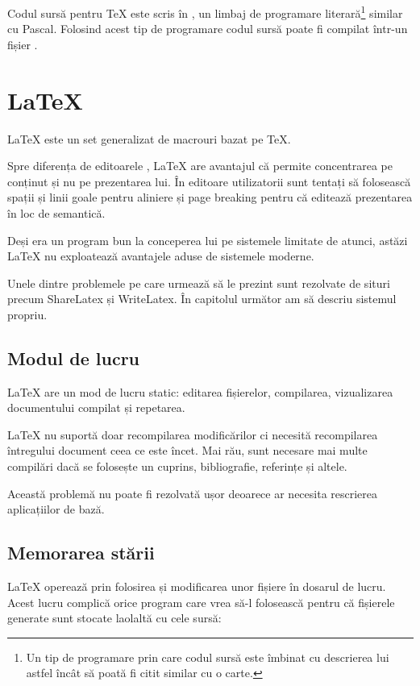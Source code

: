 \documentclass[a4wide,12pt]{report}
\newcommand{\eng}[1]{{#1}} %
\newcommand{\acr}[1]{{\textsmaller[1]{\textsc{#1}}}} %
\begin{document}
Codul sursă pentru \TeX{}\cite{texweb} este scris în \acr{WEB}, un limbaj de
programare literară\footnote{Un tip de programare prin care codul sursă este
îmbinat cu descrierea lui astfel încât să poată fi citit similar cu o carte.}
similar cu Pascal. Folosind acest tip de programare codul sursă poate fi
compilat într-un fișier \acr{PDF}\cite{texwebpdf}.

\section{\LaTeX}

\LaTeX{} este un set generalizat de macrouri bazat pe \TeX{}.

Spre diferența de editoarele \acr{WYSIWYG}, \LaTeX{} are avantajul că permite
concentrarea pe conținut și nu pe prezentarea lui. În editoare \acr{WYSIWYG}
utilizatorii sunt tentați să folosească spații și linii goale pentru aliniere
și \eng{page breaking} pentru că editează prezentarea în loc de semantică.

Deși era un program bun la conceperea lui pe sistemele limitate de atunci,
astăzi \LaTeX{} nu exploatează avantajele aduse de sistemele moderne.

Unele dintre problemele pe care urmează să le prezint sunt rezolvate de situri
precum ShareLatex și WriteLatex. În capitolul următor am să descriu sistemul
propriu.

\subsection{Modul de lucru}

\LaTeX{} are un mod de lucru static: editarea fișierelor, compilarea,
vizualizarea documentului compilat și repetarea.

\LaTeX{} nu suportă doar recompilarea modificărilor ci necesită recompilarea
întregului document ceea ce este încet. Mai rău, sunt necesare mai multe
compilări dacă se folosește un cuprins, bibliografie, referințe și altele.

Această problemă nu poate fi rezolvată ușor deoarece ar necesita rescrierea
aplicațiilor de bază.

\subsection{Memorarea stării}
\label{memstasub}

\LaTeX{} operează prin folosirea și modificarea unor fișiere în dosarul de
lucru. Acest lucru complică orice program care vrea să-l folosească pentru că
fișierele generate sunt stocate laolaltă cu cele sursă:
\end{document}
